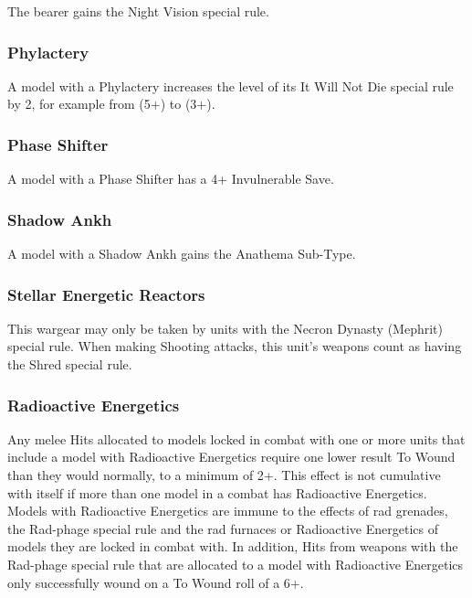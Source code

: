 The bearer gains the Night Vision special rule.

\subsubsection{Phylactery} \label{Phylactery}

A model with a Phylactery increases the level of its It Will Not Die special rule by 2, for example from (5+) to (3+).

\subsubsection{Phase Shifter} \label{Phase Shifter}

A model with a Phase Shifter has a 4+ Invulnerable Save.

\subsubsection{Shadow Ankh} \label{Shadow Ankh}

A model with a Shadow Ankh gains the Anathema Sub-Type.

\subsubsection{Stellar Energetic Reactors} \label{Stellar Energetic Reactors}

This wargear may only be taken by units with the Necron Dynasty (Mephrit) special rule. When making Shooting attacks, this unit's weapons count as having the Shred special rule.

\subsubsection{Radioactive Energetics} \label{Radioactive Energetics}

Any melee Hits allocated to models locked in combat with one or more units that include a model with Radioactive Energetics require one lower result To Wound than they would normally, to a minimum of 2+. This effect is not cumulative with itself if more than one model in a combat has Radioactive Energetics. Models with Radioactive Energetics are immune to the effects of rad grenades, the Rad-phage special rule and the rad furnaces or Radioactive Energetics of models they are locked in combat with. In addition, Hits from weapons with the Rad-phage special rule that are allocated to a model with Radioactive Energetics only successfully wound on a To Wound roll of a 6+. 

